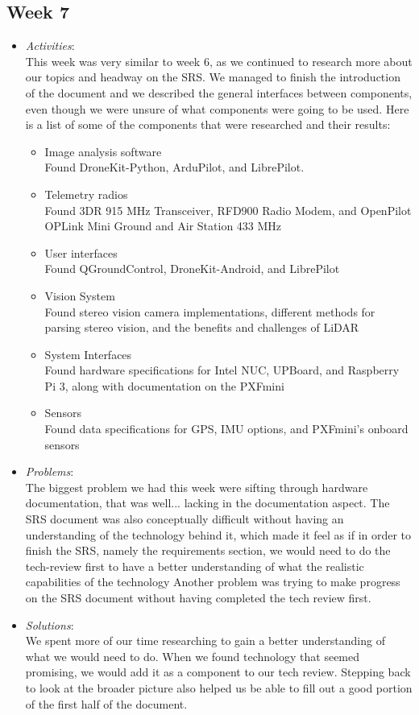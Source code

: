 \documentclass[compsoc,draftclsnofoot,onecolumn,10pt]{IEEEtran}
\begin{document}
\subsection{Week 7}
	\begin{itemize}
        \item \textit{Activities}:\\
        This week was very similar to week 6, as we continued to research more about our topics and headway on the SRS. 
        We managed to finish the introduction of the document and we described the general interfaces between components, even though we were unsure of what components were going to be used. 
        Here is a list of some of the components that were researched and their results:
        \begin{itemize}
        \item Image analysis software\\
	Found DroneKit-Python, ArduPilot, and LibrePilot.
	\item Telemetry radios \\
	Found 3DR 915 MHz Transceiver, RFD900 Radio Modem, and OpenPilot OPLink Mini Ground and Air Station 433 MHz
	\item User interfaces\\
	Found QGroundControl, DroneKit-Android, and LibrePilot
	\item Vision System \\
	Found stereo vision camera implementations, different methods for parsing stereo vision, and the benefits and challenges of LiDAR
	\item System Interfaces \\
	Found hardware specifications for Intel NUC, UPBoard, and Raspberry Pi 3, along with documentation on the PXFmini
	\item Sensors\\
	Found data specifications for GPS, IMU options, and PXFmini's onboard sensors
        \end{itemize}
        \item \textit{Problems}:\\
        The biggest problem we had this week were sifting through hardware documentation, that was well... lacking in the documentation aspect. 
        The SRS document was also conceptually difficult without having an understanding of the technology behind it, which made it feel as if in order to finish the SRS, namely the requirements section, we would need to do the tech-review first to have a better understanding of what the realistic capabilities of the technology 
        Another problem was trying to make progress on the SRS document without having completed the tech review first.
        
        \item \textit{Solutions}:\\
        We spent more of our time researching to gain a better understanding of what we would need to do. 
        When we found technology that seemed promising, we would add it as a component to our tech review.
        Stepping back to look at the broader picture also helped us be able to fill out a good portion of the first half of the document.
	\end{itemize}
   
\end{document}
